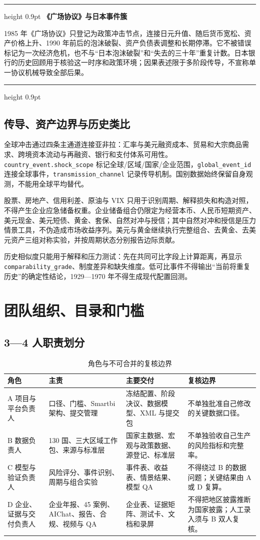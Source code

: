 \documentclass[UTF8,fontset=windows,12pt,openany]{ctexbook}
\newenvironment{warningbox}[1][]{%
  \par\medskip\noindent\begin{center}\begin{minipage}{0.93\textwidth}%
  \color{TextGray}\hrule height 0.9pt\vspace{0.45em}%
  \textbf{#1}\par\smallskip\color{black}%
}{%
  \par\vspace{0.35em}\color{TextGray}\hrule height 0.9pt%
  \end{minipage}\end{center}\medskip%
}
\newcommand{\Field}[1]{{\small\nolinkurl{#1}}}
\begin{document}
\begin{warningbox}[《广场协议》与日本事件簇]
1985 年《广场协议》只登记为政策冲击节点，连接日元升值、随后货币宽松、资产价格上升、1990 年前后的泡沫破裂、资产负债表调整和长期停滞。它不被错误标记为一次经济危机，也不与“日本泡沫破裂”和“失去的三十年”重复计数。日本银行的历史回顾用于核验这一时序和政策环境\cite{bojplaza2021,bojplazabubble2011}；因果表述限于多阶段传导，不宣称单一协议机械导致全部后果。
\end{warningbox}

\section{传导、资产边界与历史类比}

全球冲击通过四条主通道连接亚非拉：汇率与美元融资成本、贸易和大宗商品需求、跨境资本流动与再融资、银行和支付体系可用性。\Field{country_event.shock_scope} 标记全球/区域/国家/企业范围，\Field{global_event_id} 连接全球事件，\Field{transmission_channel} 记录传导机制。国别数据始终保留自身观测，不能用全球平均替代。

股票、房地产、信用利差、原油与 VIX 只用于识别周期、解释损失和构造对照，不得产生企业应急储备权重。企业储备组合仍限定为经营本币、人民币短期资产、美元现金、美元短债、黄金、套保、自然对冲与授信；其中自然对冲和授信是压力情景工具，不伪造成市场收益序列。美元与黄金继续执行完整组合、去黄金、去美元资产三组对称实验，并按周期状态分别报告边际贡献。

历史相似度只能用于解释和压力测试：先在共同可比字段上计算距离，再显示 \Field{comparability_grade}、制度差异和缺失维度。低可比事件不得输出“当前将重复历史”的确定性结论，1929—1970 年不得生成现代配置回测。

\chapter{团队组织、目录和门槛}

\section{3—4 人职责划分}

\begin{longtable}{p{2.0cm}p{3.7cm}p{4.0cm}p{3.7cm}}
\caption{角色与不可合并的复核边界}\label{tab:roles}\\
\toprule
\textbf{角色} & \textbf{主责} & \textbf{主要交付} & \textbf{复核边界}\\
\midrule
A 项目与平台负责人 & 口径、门槛、Smartbi 架构、提交管理 & 冻结配置、阶段决议、数据模型、XML 与提交包 & 不单独批准自己修改的关键数据口径。\\
B 数据负责人 & 130 国、三大区域工作包、来源与标准层 & 国家主数据、宏观与政策数据、源登记、标准层 & 不单独验收自己生产的风险指标和完整率。\\
C 模型与验证负责人 & 风险评分、事件识别、周期与组合实验 & 事件表、收益表、情景结果、模型 QA & 不得绕过 B 的数据问题；关键结果由 A 或 D 复算。\\
D 企业、证据与交付负责人 & 企业年报、45 案例、AIChat、报告、合规、视频与 QA & 企业表、证据矩阵、测试卡、文档和录屏 & 不得把地区披露推断为国家披露；人工录入须与 B 双人复核。\\
\bottomrule
\end{longtable}
\end{document}
